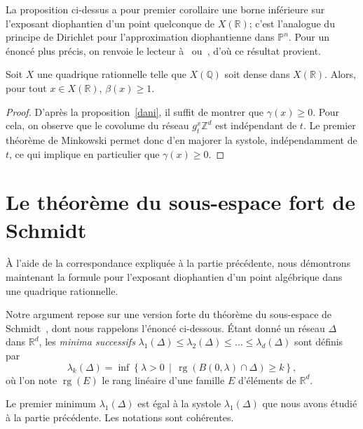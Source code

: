 \documentclass[AHL,Unicode,longabstracts,francais,published]{cedram}
\DeclareMathOperator{\rg}{rg}
\newcommand{\R}{\mathbb{R}}
\newcommand{\Z}{\mathbb{Z}}
\newcommand{\Q}{\mathbb{Q}}
\newcommand{\PP}{\mathbb{P}}
\begin{document}
La proposition ci-dessus a pour premier corollaire une borne inférieure sur l'exposant diophantien d'un point quelconque de $X(\R)$; c'est l'analogue du principe de Dirichlet pour l'approximation diophantienne dans $\PP^{n}$. Pour un énoncé plus précis, on renvoie le lecteur à~\cite[Theorem~4.1]{kleinbock-merrill} ou~\cite[Theorem~5.1]{fkms_quadric}, d'où ce résultat provient.

\begin{coro}\label{dirichlet}
Soit $X$ une quadrique rationnelle telle que $X(\Q)$ soit dense dans $X(\R)$. Alors, pour tout $x\in X(\R)$, $\beta(x)\geq 1$.
\end{coro}


\begin{proof}
D'après la proposition~\ref{dani}, il suffit de montrer que $\gamma(x)\geq 0$. Pour cela, on observe que le covolume du réseau $g_t^x\Z^d$ est indépendant de $t$. Le premier théorème de Minkowski permet donc d'en majorer la systole, indépendamment de $t$, ce qui implique en particulier que $\gamma(x)\geq 0$.
\end{proof}



\section{Le théorème du sous-espace fort de Schmidt}\label{sec:algebrique}

À l'aide de la correspondance expliquée à la partie précédente, nous démontrons maintenant la formule pour l'exposant diophantien d'un point algébrique dans une quadrique rationnelle.


Notre argument repose sur une version forte du théorème du sous-espace de Schmidt~\cite[Theorem~3A, page~163]{schmidt_da}, dont nous rappelons l'énoncé ci-dessous. Étant donné un réseau $\Delta$ dans $\R^d$, les \emph{minima successifs} $\lambda_1(\Delta)\leq \lambda_2(\Delta)\leq\dots\leq\lambda_d(\Delta)$ sont définis par
\[
\lambda_k(\Delta) = \inf\left\{\lambda>0\, \middle|\, \rg(B(0,\lambda)\cap\Delta)\geq k\right\},
\]
où l'on note $\rg(E)$ le rang linéaire d'une famille $E$ d'éléments de $\R^d$.

\begin{rema}
Le premier minimum $\lambda_1(\Delta)$ est égal à la systole $\lambda_1(\Delta)$ que nous avons étudié à la partie précédente. Les notations sont cohérentes.
\end{rema}
\end{document}

